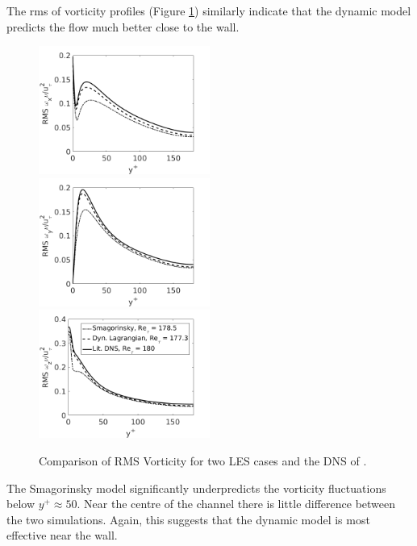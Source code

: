 \documentclass[12pt,oneside,a4paper]{article}
\begin{document}
The rms of vorticity profiles (Figure \ref{figure:rmsVorticity}) similarly indicate that the dynamic model predicts the flow much better close to the wall.
\begin{figure}[!t]
\centering
\includegraphics[width=0.5\textwidth]{images/rms_omega_x.png}\hfill
\includegraphics[width=0.5\textwidth]{images/rms_omega_y.png}\\
\includegraphics[width=0.5\textwidth]{images/rms_omega_z.png}
\caption{Comparison of RMS Vorticity for two LES cases and the DNS of \cite{vreman2014}.}
\label{figure:rmsVorticity}
\end{figure}
The Smagorinsky model significantly underpredicts the vorticity fluctuations below $y^+\approx 50$. Near the centre of the channel there is little difference between the two simulations. Again, this suggests that the dynamic model is most effective near the wall.
\end{document}
